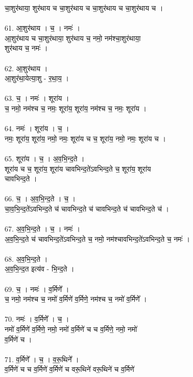 चा॒शुर॑थाया॒ शुर॑थाय च चा॒शुर॑थाय च चा॒शुर॑थाय च चा॒शुर॑थाय च ।\\
\\
61. आ॒शुर॑थाय । च॒ । नमः॑ ।\\
आ॒शुर॑थाय च चा॒शुर॑थाया॒ शुर॑थाय च॒ नमो॒ नम॑श्चा॒शुर॑थाया॒\\
शुर॑थाय च॒ नमः॑ ।\\
\\
62. आ॒शुर॑थाय ।\\
आ॒शुर॑था॒येत्या॒शु - र॒था॒य॒ ।\\
\\
63. च॒ । नमः॑ । शूरा॑य ।\\
च॒ नमो॒ नम॑श्च च॒ नमः॒ शूरा॑य॒ शूरा॑य॒ नम॑श्च च॒ नमः॒ शूरा॑य ।\\
\\
64. नमः॑ । शूरा॑य । च॒ ।\\
नमः॒ शूरा॑य॒ शूरा॑य॒ नमो॒ नमः॒ शूरा॑य च च॒ शूरा॑य॒ नमो॒ नमः॒ शूरा॑य च ।\\
\\
65. शूरा॑य । च॒ । अ॒व॒भि॒न्द॒ते ।\\
शूरा॑य च च॒ शूरा॑य॒ शूरा॑य चावभिन्द॒ते॑ऽवभिन्द॒ते च॒ शूरा॑य॒ शूरा॑य\\
चावभिन्द॒ते ।\\
\\
66. च॒ । अ॒व॒भि॒न्द॒ते । च॒ ।\\
चा॒व॒भि॒न्द॒ते॑ऽवभिन्द॒ते च॑ चावभिन्द॒ते च॑ चावभिन्द॒ते च॑ चावभिन्द॒ते च॑ ।\\
\\
67. अ॒व॒भि॒न्द॒ते । च॒ । नमः॑ ।\\
अ॒व॒भि॒न्द॒ते च॑ चावभिन्द॒ते॑ऽवभिन्द॒ते च॒ नमो॒ नम॑श्चावभिन्द॒ते॑ऽवभिन्द॒ते च॒ नमः॑ ।\\
\\
68. अ॒व॒भि॒न्द॒ते ।\\
अ॒व॒भि॒न्द॒त इत्य॑व - भि॒न्द॒ते ।\\
\\
69. च॒ । नमः॑ । व॒र्मिणे᳚ ।\\
च॒ नमो॒ नम॑श्च च॒ नमो॑ व॒र्मिणे॑ व॒र्मिणे॒ नम॑श्च च॒ नमो॑ व॒र्मिणे᳚ ।\\
\\
70. नमः॑ । व॒र्मिणे᳚ । च॒ ।\\
नमो॑ व॒र्मिणे॑ व॒र्मिणे॒ नमो॒ नमो॑ व॒र्मिणे॑ च च व॒र्मिणे॒ नमो॒ नमो॑\\
व॒र्मिणे॑ च ।\\
\\
71. व॒र्मिणे᳚ । च॒ । व॒रू॒थिने᳚ ।\\
व॒र्मिणे॑ च च व॒र्मिणे॑ व॒र्मिणे॑ च वरू॒थिने॑ वरू॒थिने॑ च व॒र्मिणे॑\\
